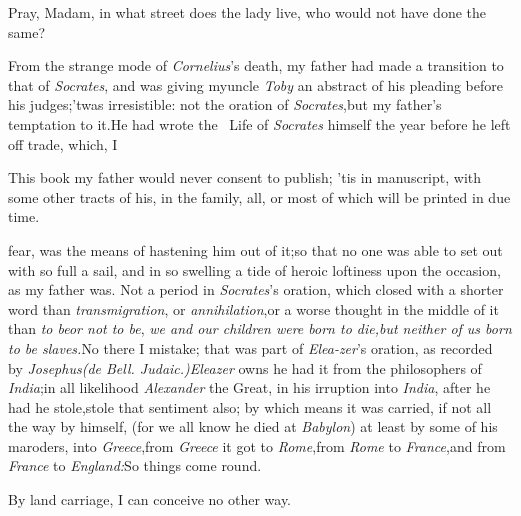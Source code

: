 \documentclass{article}
\begin{document}
\tsh  Pray, Madam, in what street does the lady live,
who would not have done the same?

From the strange mode of \textit{Cornelius}’s death, my father
had made a transition to that of \textit{Socrates}, and was
giving my\break uncle \textit{Toby} an abstract of his pleading before
his judges;\tsh ’twas irresistible:\break
\tsh not the oration of \textit{Socrates},\tsk but my father’s
temptation to it.\tsh He had wrote the \fnast\ Life of
\textit{Socrates} himself the year before he left off trade,
which, I\break

\smallskip

\bgroup\footnotesize
\indent\fnast\enspace This book my father would never
consent to publish; ’tis in manuscript, with some other tracts
of his, in the family, all, or most of which will be printed in
due time.\par\egroup{}\eject

\noindent
fear, was the means of hastening him out of it;\tsh so that no
one was able to set out with so full a sail, and in so swelling
a tide of heroic loftiness upon the occasion, as my father was.
Not a period in \textit{Socrates}’s oration, which closed with a
shorter word than \textit{transmigration}, or
\textit{annihilation},\tsk or a worse thought in the middle of
it than \textit{to be\tsk or not to be},\break
{}
\textit{we and our children were born to die,\tsk but
neither of us born to be slaves.}\tsk No\tsk\break
there I mistake; that was part of \textit{Elea-\break zer}’s oration, as recorded by
\textit{Josephus\break (de Bell. Judaic.)}\tsh \textit{Eleazer}
owns he\break
had it from the philosophers of \textit{India};\break in all
likelihood \textit{Alexander} the Great, in his irruption into
\textit{India}, after he had 
he stole,\tsk stole that sentiment also; by
which means it was carried, if not all the way by himself, (for
we all know he died at \textit{Babylon}) at least by some of
his maroders, into \textit{Greece},\tsk from \textit{Greece} it
got to \textit{Rome},\tsk from \textit{Rome} to
\textit{France},\tsk and from \textit{France} to
\textit{England:}\tsh So things come round.\tsh


By land carriage, I can conceive no other way.\tsh
\end{document}
